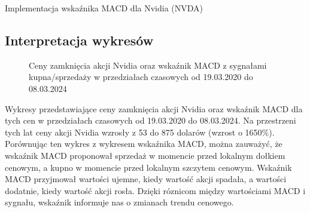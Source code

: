 \documentclass{article}
\begin{document}
\begin{section}{Implementacja wskaźnika MACD dla Nvidia (NVDA)}
    \subsection{Interpretacja wykresów}
    \begin{figure}[H]
        \caption{Ceny zamknięcia akcji Nvidia oraz wskaźnik MACD z sygnałami kupna/sprzedaży w przedziałach czasowych od 19.03.2020 do 08.03.2024}
    \end{figure}
    Wykresy przedstawiające ceny zamknięcia akcji Nvidia oraz wskaźnik MACD dla tych cen w przedziałach czasowych od 19.03.2020 do 08.03.2024.
    Na przestrzeni tych lat ceny akcji Nvidia wzrosły z 53 do 875 dolarów (wzrost o 1650\%).
    Porównując ten wykres z wykresem wskaźnika MACD, można zauważyć, że wskaźnik MACD proponował sprzedaż w momencie przed lokalnym dołkiem cenowym, a kupno w momencie przed lokalnym szczytem cenowym.
    Wskaźnik MACD przyjmował wartości ujemne, kiedy wartość akcji spadała, a wartości dodatnie, kiedy wartość akcji rosła.
    Dzięki róznicom między wartościami MACD i sygnału, wskaźnik informuje nas o zmianach trendu cenowego.


\end{section}
\end{document}

